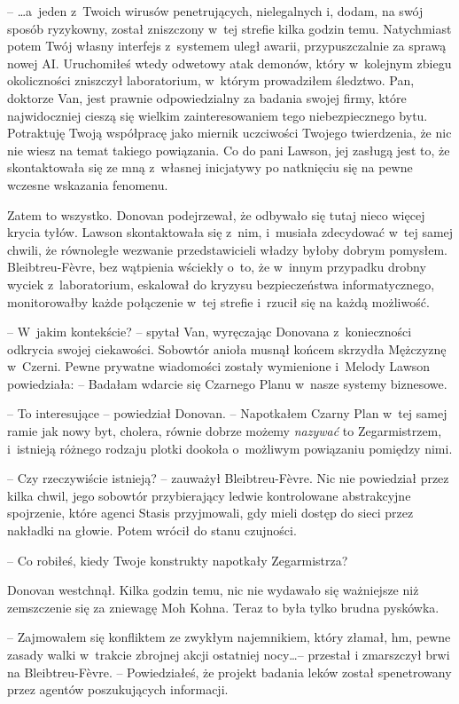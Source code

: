 \documentclass[oneside,polish,11pt,sfheadings]{mwbk}
\begin{document}
-- \ldots a~jeden z~Twoich wirusów penetrujących, nielegalnych i, dodam, na
swój sposób ryzykowny, został zniszczony w~tej strefie kilka godzin
temu. Natychmiast potem Twój własny interfejs z~systemem uległ awarii,
przypuszczalnie za sprawą nowej AI. Uruchomiłeś wtedy odwetowy atak
demonów, który w~kolejnym zbiegu okoliczności zniszczył laboratorium, w~którym prowadziłem śledztwo. Pan, doktorze Van, jest prawnie
odpowiedzialny za badania swojej firmy, które najwidoczniej cieszą się
wielkim zainteresowaniem tego niebezpiecznego bytu. Potraktuję Twoją
współpracę jako miernik uczciwości Twojego twierdzenia, że nic nie wiesz
na temat takiego powiązania. Co do pani Lawson, jej zasługą jest to, że
skontaktowała się ze mną z~własnej inicjatywy po natknięciu się na pewne
wczesne wskazania fenomenu.

Zatem to wszystko. Donovan podejrzewał, że odbywało się tutaj nieco
więcej krycia tyłów. Lawson skontaktowała się z~nim, i~musiała
zdecydować w~tej samej chwili, że równoległe wezwanie przedstawicieli
władzy byłoby dobrym pomysłem. Bleibtreu-Fèvre, bez wątpienia wściekły o~to, że w~innym przypadku drobny wyciek z~laboratorium, eskalował do
kryzysu bezpieczeństwa informatycznego, monitorowałby każde połączenie w~tej strefie i~rzucił się na każdą możliwość.

-- W~jakim kontekście? -- spytał Van, wyręczając Donovana z~konieczności
odkrycia swojej ciekawości. Sobowtór anioła musnął końcem skrzydła
Mężczyznę w~Czerni. Pewne prywatne wiadomości zostały wymienione i~Melody Lawson powiedziała: -- Badałam wdarcie się Czarnego Planu w~nasze
systemy biznesowe.

-- To interesujące -- powiedział Donovan. -- Napotkałem Czarny Plan w~tej
samej ramie jak nowy byt, cholera, równie dobrze możemy \emph{nazywać
}to Zegarmistrzem, i~istnieją różnego rodzaju plotki dookoła o~możliwym
powiązaniu pomiędzy nimi.

-- Czy rzeczywiście istnieją? -- zauważył Bleibtreu-Fèvre. Nic nie
powiedział przez kilka chwil, jego sobowtór przybierający ledwie
kontrolowane abstrakcyjne spojrzenie, które agenci Stasis przyjmowali,
gdy mieli dostęp do sieci przez nakładki na głowie. Potem wrócił do
stanu czujności.

-- Co robiłeś, kiedy Twoje konstrukty napotkały Zegarmistrza?

Donovan westchnął. Kilka godzin temu, nic nie wydawało się ważniejsze
niż zemszczenie się za zniewagę Moh Kohna. Teraz to była tylko brudna
pyskówka.

-- Zajmowałem się konfliktem ze zwykłym najemnikiem, który złamał, hm,
pewne zasady walki w~trakcie zbrojnej akcji ostatniej nocy\ldots -- przestał
i zmarszczył brwi na Bleibtreu-Fèvre. -- Powiedziałeś, że projekt badania
leków został spenetrowany przez agentów poszukujących informacji.
\end{document}
